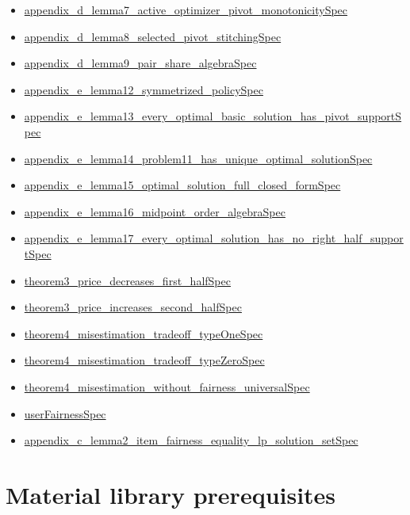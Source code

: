\documentclass[10pt]{article}
\begin{document}
\begin{itemize}[leftmargin=1.2em]
\begin{itemize}[leftmargin=1.2em]
\item \hyperlink{source-claim-9c661bd3034e665b}{appendix\_d\_lemma7\_active\_optimizer\_pivot\_monotonicitySpec}
\item \hyperlink{source-claim-80513579ff0f392a}{appendix\_d\_lemma8\_selected\_pivot\_stitchingSpec}
\item \hyperlink{source-claim-b15ee860ec553bb1}{appendix\_d\_lemma9\_pair\_share\_algebraSpec}
\item \hyperlink{source-claim-e72b5fec2071cbe5}{appendix\_e\_lemma12\_symmetrized\_policySpec}
\item \hyperlink{source-claim-090419aeb8d7a8b0}{appendix\_e\_lemma13\_every\_optimal\_basic\_solution\_has\_pivot\_supportSpec}
\item \hyperlink{source-claim-053b388150665c75}{appendix\_e\_lemma14\_problem11\_has\_unique\_optimal\_solutionSpec}
\item \hyperlink{source-claim-2442d32f650b179f}{appendix\_e\_lemma15\_optimal\_solution\_full\_closed\_formSpec}
\item \hyperlink{source-claim-fa20503a4cc73d27}{appendix\_e\_lemma16\_midpoint\_order\_algebraSpec}
\item \hyperlink{source-claim-cac20912e50cfdb7}{appendix\_e\_lemma17\_every\_optimal\_solution\_has\_no\_right\_half\_supportSpec}
\item \hyperlink{source-claim-b8bc7fe7622f9901}{theorem3\_price\_decreases\_first\_halfSpec}
\item \hyperlink{source-claim-9cd33ed0f79952fe}{theorem3\_price\_increases\_second\_halfSpec}
\item \hyperlink{source-claim-eae0a47427c4efe2}{theorem4\_misestimation\_tradeoff\_typeOneSpec}
\item \hyperlink{source-claim-c68da4ed1cd3be2b}{theorem4\_misestimation\_tradeoff\_typeZeroSpec}
\item \hyperlink{source-claim-d63dd1782000f9f6}{theorem4\_misestimation\_without\_fairness\_universalSpec}
\item \hyperlink{source-claim-3691478eb60ec56f}{userFairnessSpec}
\item \hyperlink{source-claim-dd1e59dd74c380a1}{appendix\_c\_lemma2\_item\_fairness\_equality\_lp\_solution\_setSpec}
\end{itemize}
\end{itemize}

\clearpage
\hypertarget{library-section-c26db27dcc5f31c6}{}
\section*{Material library prerequisites}
\hypertarget{library-prerequisite-a044ec78dc3416bb}{}
\end{document}
